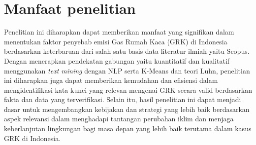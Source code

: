 
\section{Manfaat penelitian}
Penelitian ini diharapkan dapat memberikan manfaat yang signifikan dalam menentukan faktor penyebab emisi Gas Rumah Kaca (GRK) di Indonesia berdasarkan keterbaruan dari salah satu basis data literatur ilmiah yaitu Scopus. Dengan menerapkan pendekatan gabungan yaitu kuantitatif dan kualitatif menggunakan \textit{text mining} dengan NLP serta K-Means dan teori Luhn, penelitian ini diharapkan juga dapat memberikan kemudahan dan efisiensi dalam mengidentifikasi kata kunci yang relevan mengenai GRK secara valid berdasarkan fakta dan data yang terverifikasi. Selain itu, hasil penelitian ini dapat menjadi dasar untuk mengembangkan kebijakan dan strategi yang lebih baik berdasarkan aspek relevansi dalam menghadapi tantangan perubahan iklim dan menjaga keberlanjutan lingkungan bagi masa depan yang lebih baik terutama dalam kasus GRK di Indonesia.